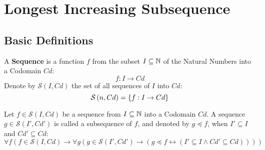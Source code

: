 \newcommand{\sequence}[2]{\ensuremath{\mathcal{S}\left( #1, #2 \right)}}
\newcommand{\subsequence}[2]{\ensuremath{#1 \preceq #2}}

\chapter{Longest Increasing Subsequence}

\section{Basic Definitions}

\begin{defn}[Sequence]
    A \textbf{Sequence} is a function $f$ from the subset $I \subseteq \mathbb{N}$ of the Natural Numbers into a Codomain $Cd$:
    \begin{equation}
        f: I \rightarrow Cd
    \end{equation}
    Denote by $\sequence{I}{Cd}$ the set of all sequences of $I$ into $Cd$:
    \begin{equation}
        \sequence{n}{Cd} = \Set{f: I \rightarrow Cd}
    \end{equation}
\end{defn}

\begin{defn}[Subsequence]
    Let $f \in \sequence{I}{Cd}$ be a sequence from $I \subseteq \mathbb{N}$ into a Codomain $Cd$. A sequence $g \in \sequence{I'}{Cd'}$ is called a subsequence of $f$, and denoted by $\subsequence{g}{f}$, when $I' \subseteq I$ and $Cd' \subseteq Cd$:
    \begin{equation}
        \forall f \left(
            f \in \sequence{I}{Cd}
            \rightarrow
            \forall g \left(
                g \in \sequence{I'}{Cd'}
                \rightarrow
                \left(
                    \subsequence{g}{f} \leftrightarrow \left(
                        I' \subseteq I
                        \land
                        Cd' \subseteq Cd
                    \right)
                \right)
            \right)
        \right)
    \end{equation}
\end{defn}
